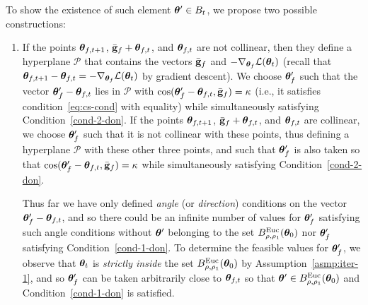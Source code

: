 To show the existence of such element ${\bm{\theta}}' \in B_t$, we propose two possible constructions:
\begin{enumerate}[{Choice} (A):]
\item  
If the points ${\bm{\theta}}_{f,t+1}$, $\bar{\mathbf{g}}_f + {\bm{\theta}}_{f,t}$, and ${\bm{\theta}}_{f,t}$ are not collinear, then they define a hyperplane $\mathcal{P}$ that contains the vectors $\bar{\mathbf{g}}_f$ and $-\nabla_{{\bm{\theta}}_f} {\cal L}({\bm{\theta}}_t)$ (recall that ${\bm{\theta}}_{f,t+1} - {\bm{\theta}}_{f,t}=-\nabla_{{\bm{\theta}}_f}{\cal L}({\bm{\theta}}_t)$ by gradient descent). We choose ${\bm{\theta}}'_f$ such that the vector 
${\bm{\theta}}'_f-{\bm{\theta}}_{f,t}$ 
lies in 
$\mathcal{P}$ 
%
%
with 
$\cos({\bm{\theta}}'_f-{\bm{\theta}}_{f,t},\bar{\mathbf{g}}_f)=\kappa$ (i.e., it satisfies condition~\eqref{eq:cs-cond} with equality) while simultaneously satisfying Condition~\eqref{cond-2-don}.
%
%
If the points ${\bm{\theta}}_{f,t+1}$, $\bar{\mathbf{g}}_f + {\bm{\theta}}_{f,t}$, and ${\bm{\theta}}_{f,t}$ are collinear, we choose ${\bm{\theta}}'_f$ such that it is not collinear with these points, thus defining a hyperplane $\mathcal{P}$ %
with these other three points, 
and such that 
${\bm{\theta}}'_f$ is also taken so that $\cos({\bm{\theta}}'_f-{\bm{\theta}}_{f,t},\bar{\mathbf{g}}_f)=\kappa$ while simultaneously satisfying Condition~\eqref{cond-2-don}.
%

Thus far we have only defined \emph{angle} (or \emph{direction}) conditions on the vector ${\bm{\theta}}'_f-{\bm{\theta}}_{f,t}$, and so there could be an infinite number of values for ${\bm{\theta}}'_f$ satisfying such angle conditions without ${\bm{\theta}}'$ belonging to the set $B^{\mathrm{Euc}}_{\rho,\rho_1}({\bm{\theta}}_0)$ nor ${\bm{\theta}}'_f$ satisfying Condition~\eqref{cond-1-don}. To determine the feasible values for ${\bm{\theta}}'_f$, we observe that ${\bm{\theta}}_t$ is \emph{strictly inside} the set $B^{\mathrm{Euc}}_{\rho,\rho_1}({\bm{\theta}}_0)$ by Assumption~\ref{asmp:iter-1}, and so 
%
%
${\bm{\theta}}'_f$ can be taken arbitrarily close to ${\bm{\theta}}_{f,t}$ so that ${\bm{\theta}}'\in B^{\mathrm{Euc}}_{\rho,\rho_1}({\bm{\theta}}_0)$ and Condition~\eqref{cond-1-don} is satisfied. 
%


\end{enumerate}
